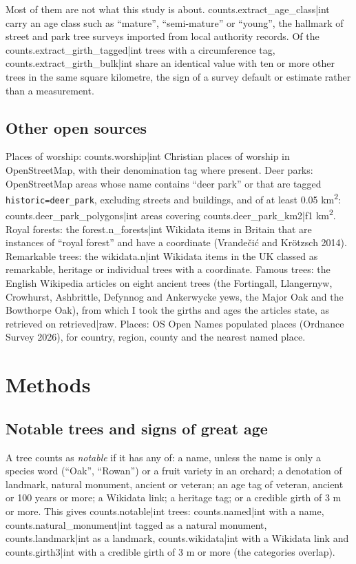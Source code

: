 \documentclass[11pt,a4paper]{article}
\begin{document}
Most of them are not what this study is about. {{counts.extract_age_class|int}} carry an age class such as ``mature'', ``semi-mature'' or ``young'', the hallmark of street and park tree surveys imported from local authority records. Of the {{counts.extract_girth_tagged|int}} trees with a circumference tag, {{counts.extract_girth_bulk|int}} share an identical value with ten or more other trees in the same square kilometre, the sign of a survey default or estimate rather than a measurement.

\subsection{Other open sources}

Places of worship: {{counts.worship|int}} Christian places of worship in OpenStreetMap, with their denomination tag where present. Deer parks: OpenStreetMap areas whose name contains ``deer park'' or that are tagged \texttt{historic=deer\_park}, excluding streets and buildings, and of at least 0.05 km\textsuperscript{2}: {{counts.deer_park_polygons|int}} areas covering {{counts.deer_park_km2|f1}} km\textsuperscript{2}. Royal forests: the {{forest.n_forests|int}} Wikidata items in Britain that are instances of ``royal forest'' and have a coordinate (Vrandečić and Krötzsch 2014). Remarkable trees: the {{wikidata.n|int}} Wikidata items in the UK classed as remarkable, heritage or individual trees with a coordinate. Famous trees: the English Wikipedia articles on eight ancient trees (the Fortingall, Llangernyw, Crowhurst, Ashbrittle, Defynnog and Ankerwycke yews, the Major Oak and the Bowthorpe Oak), from which I took the girths and ages the articles state, as retrieved on {{retrieved|raw}}. Places: OS Open Names populated places (Ordnance Survey 2026), for country, region, county and the nearest named place.

\section{Methods}

\subsection{Notable trees and signs of great age}

A tree counts as \emph{notable} if it has any of: a name, unless the name is only a species word (``Oak'', ``Rowan'') or a fruit variety in an orchard; a denotation of landmark, natural monument, ancient or veteran; an age tag of veteran, ancient or 100 years or more; a Wikidata link; a heritage tag; or a credible girth of 3 m or more. This gives {{counts.notable|int}} trees: {{counts.named|int}} with a name, {{counts.natural_monument|int}} tagged as a natural monument, {{counts.landmark|int}} as a landmark, {{counts.wikidata|int}} with a Wikidata link and {{counts.girth3|int}} with a credible girth of 3 m or more (the categories overlap).
\end{document}
